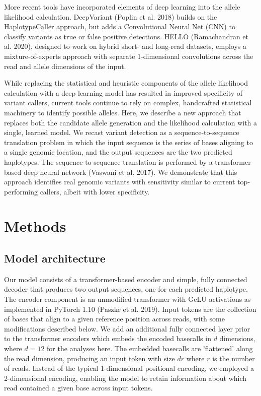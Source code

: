 \documentclass[]{article}
\begin{document}
More recent tools have incorporated elements of deep learning into the allele likelihood calculation. DeepVariant (Poplin et al. 2018) builds on the HaplotypeCaller approach, but adds a Convolutional Neural Net (CNN) to classify variants as true or false positive detections. HELLO (Ramachandran et al. 2020), designed to work on hybrid short- and long-read datasets, employs a mixture-of-experts approach with separate 1-dimensional convolutions across the read and allele dimensions of the input. 

While replacing the statistical and heuristic components of the allele likelihood calculation with a deep learning model has resulted in improved specificity of variant callers, current tools continue to rely on complex, handcrafted statistical machinery to identify possible alleles. Here, we describe a new approach that replaces both the candidate allele generation and the likelihood calculation with a single, learned model. We recast variant detection as a sequence-to-sequence translation problem in which the input sequence is the series of bases aligning to a single genomic location, and the output sequences are the two predicted haplotypes. The sequence-to-sequence translation is performed by a transformer-based deep neural network (Vaswani et al. 2017). We demonstrate that this approach identifies real genomic variants with sensitivity similar to current top-performing callers, albeit with lower specificity. 



\section{Methods}

\subsection{Model architecture}

Our model consists of a transformer-based encoder and simple, fully connected decoder that produces two output sequences, one for each predicted haplotype. The encoder component is an unmodified transformer with GeLU activations as implemented in PyTorch 1.10 (Paszke et al. 2019). Input tokens are the collection of bases that align to a given reference position across reads, with some modifications described below. We add an additional fully connected layer prior to the transformer encoders which embeds the encoded basecalls in $d$ dimensions, where $d=12$ for the analyses here. The embedded basecalls are 'flattened' along the read dimension, producing an input token with size $dr$ where $r$ is the number of reads. Instead of the typical 1-dimensional positional encoding, we employed a 2-dimensional encoding, enabling the model to retain information about which read contained a given base across input tokens. 
\end{document}
